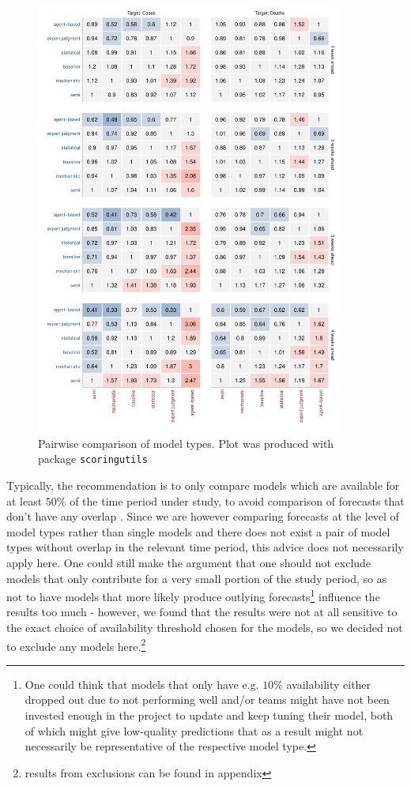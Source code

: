 \begin{figure}
\centering
\includegraphics[width = 0.9\textwidth]{../plots/pw_comp_model_type_with_other.pdf}
\caption{Pairwise comparison of model types. Plot was produced with package \texttt{scoringutils}}
\label{fig:pw_comp_modeltypes}
\end{figure}
Typically, the recommendation is to only compare models which are available for at least $50\% $ of the time period under study, to avoid comparison of forecasts that don't have any overlap \citep{bosse_epiforecastsscoringutils_2022}. Since we are however comparing forecasts at the level of model types rather than single models and there does not exist a pair of model types without overlap in the relevant time period, this advice does not necessarily apply here. One could still make the argument that one should not exclude models that only contribute for a very small portion of the study period, so as not to have models that more likely produce outlying forecasts\footnote{One could think that models that only have e.g. $10\%$ availability either dropped out due to not performing well and/or teams might have not been invested enough in the project to update and keep tuning their model, both of which might give low-quality predictions that as a result might not necessarily be representative of the respective model type.} influence the results too much - however, we found that the results were not at all sensitive to the exact choice of availability threshold chosen for the models, so we decided not to exclude any models here.\footnote{results from exclusions can be found in appendix} \\ 
